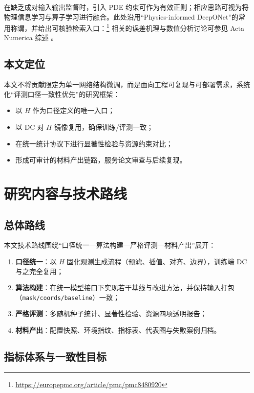 在缺乏成对输入输出监督时，引入 PDE 约束可作为有效正则；相应思路可视为将物理信息学习与算子学习进行融合。此处沿用“Physics-informed DeepONet”的常用称谓，并给出可核验检索入口：\footnote{\url{https://europepmc.org/article/pmc/pmc8480920}}
相关的误差机理与数值分析讨论可参见 Acta Numerica 综述 \parencite{deryck2024acta_numerica}。

\subsection{本文定位}

本文不将贡献限定为单一网络结构微调，而是面向工程可复现与可部署需求，系统化“评测口径一致性优先”的研究框架：
\begin{itemize}
  \item 以 \(H\) 作为口径定义的唯一入口；
  \item 以 \(\mathrm{DC}\) 对 \(H\) 镜像复用，确保训练/评测一致；
  \item 在统一统计协议下进行显著性检验与资源约束对比；
  \item 形成可审计的材料产出链路，服务论文审查与后续复现。
\end{itemize}

\section{研究内容与技术路线}

\subsection{总体路线}

本文技术路线围绕“口径统一—算法构建—严格评测—材料产出”展开：
\begin{enumerate}
  \item \textbf{口径统一}：以 \(H\) 固化观测生成流程（预滤、插值、对齐、边界），训练端 \(\mathrm{DC}\) 与之完全复用；
  \item \textbf{算法构建}：在统一模型接口下实现若干基线与改进方法，并保持输入打包（\nolinkurl{mask/coords/baseline}）一致；
  \item \textbf{严格评测}：多随机种子统计、显著性检验、资源四项透明报告；
  \item \textbf{材料产出}：配置快照、环境指纹、指标表、代表图与失败案例归档。
\end{enumerate}

\subsection{指标体系与一致性目标}


